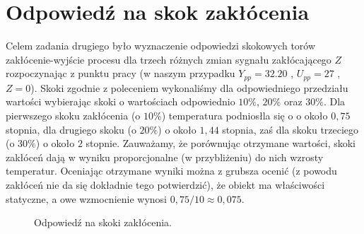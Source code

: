 \chapter{Odpowiedź na skok zakłócenia}
Celem zadania drugiego było wyznaczenie odpowiedzi skokowych torów zakłócenie-wyjście
procesu dla trzech różnych zmian sygnału zakłócającego $Z$ rozpoczynając z punktu pracy
(w naszym przypadku $Y_{pp} = 32.20$ , $U_{pp} = 27$ , $Z = 0$). Skoki zgodnie z
poleceniem wykonaliśmy dla odpowiedniego przedziału wartości wybierając skoki o
wartościach odpowiednio $10\%$, $20\%$ oraz $30\%$. Dla pierwszego skoku
zakłócenia (o $10\%$) temperatura podniosłla się o o około $0,75$ stopnia,
dla drugiego skoku (o $20\%$) o około $1,44$ stopnia, zaś dla skoku trzeciego
(o $30\%$) o około $2$ stopnie. Zauważamy, że porównując otrzymane
wartości, skoki zakłóceń dają  w wyniku proporcjonalne (w przybliżeniu)
do nich wzrosty temperatur. Oceniając otrzymane wyniki można z grubsza ocenić
(z powodu zakłóceń nie da się dokładnie tego potwierdzić), że obiekt ma
właściwości statyczne, a owe wzmocnienie wynosi $0,75/10 \approx 0,075$.

\begin{figure}[tb]
\centering
{}
\caption{Odpowiedź na skoki zakłócenia.}
\label{fig:skok_zak}
\end{figure}
